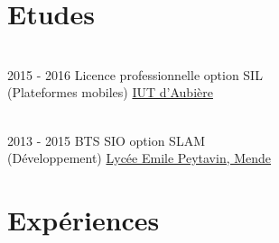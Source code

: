 \documentclass[letterpaper]{twentysecondcv} %
\begin{document}
\makeprofile %

\section{Etudes}

\begin{twenty} %
\\
	\twentyitem
    	{2015 - 2016}
        {}
        {Licence professionnelle option SIL \\ \textnormal{(Plateformes mobiles)}}
        {\href{https://iutweb.u-clermont1.fr/}{IUT d'Aubière}}
        {}
        {}
        
        \\
	\twentyitem
    	{2013 - 2015}
		{}
        {BTS SIO option SLAM \\ \textnormal{(Développement)}}
        {\href{https://www.lyceepeytavin.com/}{Lycée Emile Peytavin, Mende}}
        {}
        {}
\end{twenty}



\section{Expériences}
\end{document}
